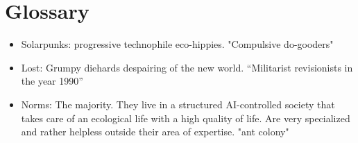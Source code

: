\documentclass{book}
\begin{document}
\chapter{Glossary}


\begin{itemize}
\item Solarpunks: progressive technophile eco-hippies. "Compulsive do-gooders"
\item  Lost: Grumpy diehards despairing of the new world. “Militarist revisionists in the year
1990”
\item Norms: The majority. They live in a structured AI-controlled society that takes care of an ecological life with a high
quality of life. Are very specialized and rather helpless outside their area of expertise.
"ant colony"
\end{itemize}
\end{document}
